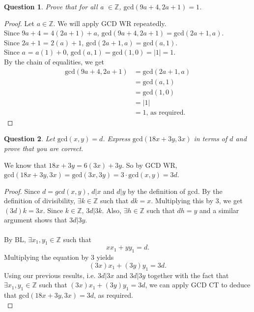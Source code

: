 \documentclass[11pt,oneside]{article}
\newtheorem{question}{Question}
\begin{document}
\begin{question}
	Prove that for all a $\in \mathbb{Z}$, $\text{gcd}(9a + 4, 2a + 1) = 1$.
\end{question}

\begin{proof}
	Let $a \in \mathbb{Z}$. We will apply GCD WR repeatedly.\\
	
	Since $9a+4$ = $4(2a+1)+a$, $\text{gcd}(9a+4,2a+1)=\text{gcd}(2a+1,a)$.\\
	Since $2a+1$ = $2(a)+1$, $\text{gcd}(2a+1,a)=\text{gcd}(a,1)$.\\
	Since $a$ = $a(1)+0$, $\text{gcd}(a,1)=\text{gcd}(1,0)=\vert1\vert=1$.\\
	
	By the chain of equalities, we get
	\begin{align*}
		\text{gcd}(9a+4,2a+1) &= \text{gcd}(2a+1,a)\\
		&=\text{gcd}(a,1)\\
		&=\text{gcd}(1,0)\\
		&=\vert1\vert\\
		&=1\text{, as required.}
	\end{align*}
\end{proof}

\bigskip

\begin{question}
	Let $\text{gcd}(x, y) = d$. Express $\text{gcd}(18x + 3 y, 3x)$ in terms of $d$ and prove that you are correct.
\end{question}

\bigskip

We know that $18x + 3y=6(3x) + 3y$. So by GCD WR, $\text{gcd}(18x + 3y,3x)=\text{gcd}(3x,3y)=3\cdot\text{gcd}(x,y)=3d$.

\begin{proof}
	Since $d=gcd(x,y)$, $d | x$ and $d | y$ by the definition of gcd. 
	By the definition of divisibility, $\exists k\in\mathbb{Z}$ such that $dk = x$.
	Multiplying this by $3$, we get $(3d)k=3x$. Since $k \in \mathbb{Z}$, $3d \vert 3k$. 
	Also, $\exists h\in\mathbb{Z}$ such that $dh = y$ and a similar argument shows that $3d|3y$.\\\\
	By BL, $\exists x_1,y_1\in\mathbb{Z}$ such that $$xx_1 + yy_1 = d.$$ Multiplying the equation by $3$ yields $$(3x)x_1 + (3y)y_1 = 3d.$$
	Using our previous results, i.e. $3d|3x$ and $3d|3y$ together with the fact that $\exists x_1,y_1\in\mathbb{Z}$ such that $(3x)x_1 + (3y)y_1 = 3d$, we can apply GCD CT to deduce that $\text{gcd}(18x + 3y,3x)=3d$, as required.\\
\end{proof}
\end{document}
